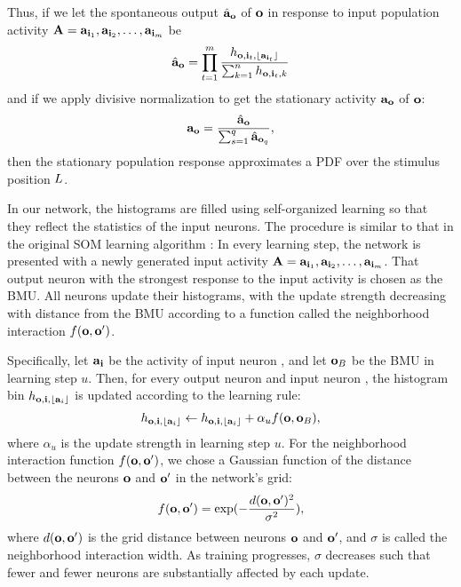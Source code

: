 Thus, if we let the spontaneous output $\hat{\mathbf{a}}_{\mathbf{o}}$ of $\mathbf{o}$ in response to input population activity $\mathbf{A}=\mathbf{a}_{\mathbf{i}_1},\mathbf{a}_{\mathbf{i}_2},\dots,\mathbf{a}_{\mathbf{i}_m}$ be 
\[
    \hat{\mathbf{a}}_{\mathbf{o}} = \prod^m_{t=1} \frac{h_{\mathbf{o},\mathbf{i}_t,\lfloor\mathbf{a}_{\mathbf{i}_t}\rfloor}}{\sum^n_{k=1}h_{\mathbf{o},\mathbf{i}_t,k}}
\]
and if we apply divisive normalization to get the stationary activity $\mathbf{a}_{\mathbf{o}}$ of $\mathbf{o}$:
\[
    \mathbf{a}_{\mathbf{o}} = \frac{\hat{\mathbf{a}}_{\mathbf{o}}}{\sum^q_{s=1}\hat{\mathbf{a}}_{\mathbf{o}_q}},
\]
then the stationary population response approximates a \ac{PDF} over the stimulus position $L$.

In our network, the histograms are filled using self-organized learning so that they reflect the statistics of the input neurons.
The procedure is similar to that in the original \ac{SOM} learning algorithm \citep[p.~78--83]{kohonen-1995}:
In every learning step, the network is presented with a newly generated input activity $\mathbf{A}=\mathbf{a}_{\mathbf{i}_1},\mathbf{a}_{\mathbf{i}_2},\dots,\mathbf{a}_{\mathbf{i}_m}$.
That output neuron with the strongest response to the input activity is chosen as the \ac{BMU}.
All neurons update their histograms, with the update strength decreasing with distance from the \ac{BMU} according to a function called the neighborhood interaction $f(\mathbf{o},\mathbf{o}')$.

Specifically, let $\mathbf{a}_{\mathbf{i}}$ be the activity of input neuron , and let $\mathbf{o}_{B}$ be the \ac{BMU} in learning step $u$.
Then, for every output neuron  and input neuron , the histogram bin $h_{\mathbf{o},\mathbf{i},\lfloor{\ensuremath{\mathbf{a}}_{i}\rfloor}}$ is updated according to the learning rule:
\[
    h_{\mathbf{o},\mathbf{i},\lfloor{\ensuremath{\mathbf{a}}_{i}\rfloor}} \leftarrow h_{\mathbf{o},\mathbf{i},\lfloor{\ensuremath{\mathbf{a}}_{i}\rfloor}} + \alpha_uf(\mathbf{o},\mathbf{o}_{B}),
\]
where $\alpha_u$ is the update strength in learning step $u$.
For the neighborhood interaction function $f(\mathbf{o},\mathbf{o}')$, we chose a Gaussian function of the distance between the neurons $\mathbf{o}$ and $\mathbf{o}'$ in the network's grid:
\[
    f(\mathbf{o}, \mathbf{o}') = \exp(-\frac{d(\mathbf{o},\mathbf{o}')^2}{\sigma^2}),
\]
where $d(\mathbf{o},\mathbf{o}')$ is the grid distance between neurons $\mathbf{o}$ and $\mathbf{o}'$, and $\sigma$ is called the neighborhood interaction width.
As training progresses, $\sigma$ decreases such that fewer and fewer neurons are substantially affected by each update.

